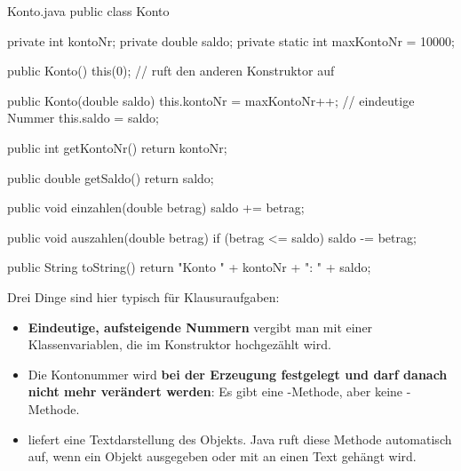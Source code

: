\beispiele
{}
\begin{center}
\end{center}
\begin{javacode}{Konto.java}
public class Konto {
	private int kontoNr;
	private double saldo;
	private static int maxKontoNr = 10000;

	public Konto() {
		this(0);                    // ruft den anderen Konstruktor auf
	}

	public Konto(double saldo) {
		this.kontoNr = maxKontoNr++;        // eindeutige Nummer
		this.saldo = saldo;
	}

	public int getKontoNr() { return kontoNr; }

	public double getSaldo() { return saldo; }

	public void einzahlen(double betrag) {
		saldo += betrag;
	}

	public void auszahlen(double betrag) {
		if (betrag <= saldo) {
			saldo -= betrag;
		}
	}

	public String toString() {
		return "Konto " + kontoNr + ": " + saldo;
	}
}
\end{javacode}
Drei Dinge sind hier typisch für Klausuraufgaben:
\begin{itemize}[itemsep=0.1em]
\item \textbf{Eindeutige, aufsteigende Nummern} vergibt man mit einer Klassenvariablen, die im Konstruktor hochgezählt wird.
\item Die Kontonummer wird \textbf{bei der Erzeugung festgelegt und darf danach nicht mehr verändert werden}: Es gibt eine -Methode, aber keine -Methode.
\item {} liefert eine Textdarstellung des Objekts. Java ruft diese Methode automatisch auf, wenn ein Objekt ausgegeben oder mit \code{+} an einen Text gehängt wird.
\end{itemize}

